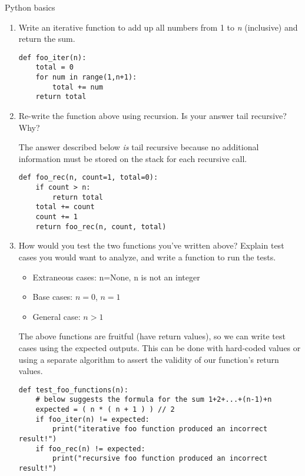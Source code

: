 Python basics
\begin{enumerate}

\item Write an iterative function to add up all numbers from 1 to \emph{n} (inclusive) and return the sum.

\begin{answer}
\begin{lstlisting}
def foo_iter(n):
	total = 0
	for num in range(1,n+1):
		total += num
	return total
\end{lstlisting}
\end{answer}

\item Re-write the function above using recursion. Is your answer tail recursive?  Why?

\begin{answer}
The answer described below \emph{is} tail recursive because no additional information must be stored on the stack for each recursive call.

\begin{lstlisting}
def foo_rec(n, count=1, total=0):
	if count > n:
		return total
	total += count
	count += 1
	return foo_rec(n, count, total)
\end{lstlisting}
\end{answer}

\item How would you test the two functions you've written above? Explain test cases you would want to analyze, and write a function to run the tests.

\begin{answer}
\begin{itemize}
\item Extraneous cases: n=None, n is not an integer
\item Base cases: $n=0$, $n=1$
\item General case: $n > 1$
\end{itemize}
The above functions are fruitful (have return values), so we can write test cases using the expected outputs. This can be done with hard-coded values or using a separate algorithm
to assert the validity of our function's return values.
\begin{lstlisting}
def test_foo_functions(n):
	# below suggests the formula for the sum 1+2+...+(n-1)+n
	expected = ( n * ( n + 1 ) ) // 2
	if foo_iter(n) != expected:
		print("iterative foo function produced an incorrect result!")
	if foo_rec(n) != expected:
		print("recursive foo function produced an incorrect result!")
\end{lstlisting}
\end{answer}

\end{enumerate}




